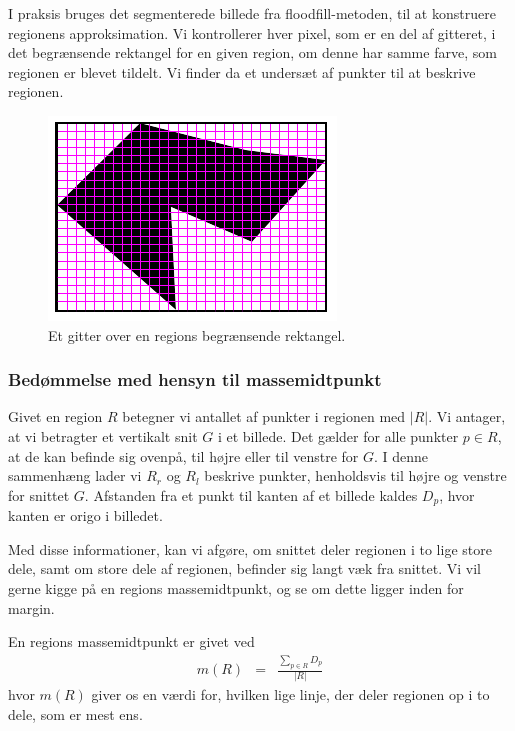{I praksis bruges det segmenterede billede fra floodfill-metoden, til at
konstruere regionens approksimation. Vi kontrollerer hver pixel, som er
en del af gitteret, i det begrænsende rektangel for en given region, om
denne har samme farve, som regionen er blevet tildelt. Vi finder da et
undersæt af punkter til at beskrive regionen.

\begin{figure}[h]
    \centering
    \includegraphics[scale=0.76,angle=0]{afsnit/vores_implementation/billeder/udvidet_loesning/udvidetloesninglayer.png}
    \caption[]{Et gitter over en regions begrænsende rektangel.}
    \label{grid}
\end{figure}

\subsubsection{Bedømmelse med hensyn til massemidtpunkt}
Givet en region $R$ betegner vi antallet af punkter i regionen med
$|R|$. Vi antager, at vi betragter et vertikalt snit $G$ i et billede.
Det gælder for alle punkter $p \in R$, at de kan befinde sig ovenpå,
til højre eller til venstre for $G$. I denne sammenhæng lader vi $R_r$
og $R_l$ beskrive punkter, henholdsvis til højre og venstre for snittet
$G$.  Afstanden fra et punkt til kanten af et billede kaldes $D_p$, hvor
kanten er origo i billedet.

Med disse informationer, kan vi afgøre, om snittet deler regionen i to
lige store dele, samt om store dele af regionen, befinder sig langt væk
fra snittet. Vi vil gerne kigge på en regions massemidtpunkt, og se om
dette ligger inden for margin.

\begin{definition}
    En regions massemidtpunkt er givet ved
    \begin{eqnarray}
        m(R) & = & \frac{\sum_{p \in R}{D_p}}{|R|} \label{masssemidpunkt}
        \label{MPunkt}
    \end{eqnarray}
    hvor $m(R)$ giver os en værdi for, hvilken lige linje, der deler
    regionen op i to dele, som er mest ens.
    \label{def_massemidtpunkt}
\end{definition}

}

